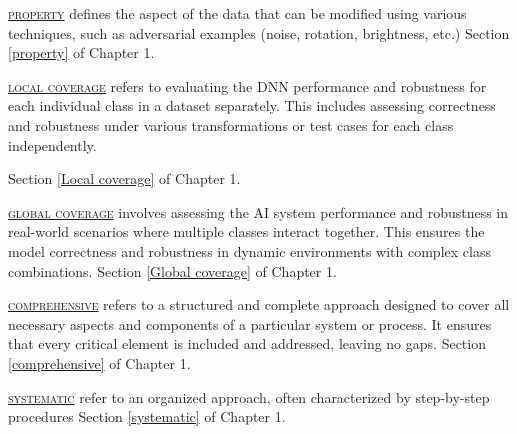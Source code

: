   \textsc{\hyperref[property]{\textsc{property}}} 
  defines the aspect of the data that can be modified using various techniques, such as adversarial examples (noise, rotation, brightness, etc.) Section \ref{property} of Chapter 1.
  
 


  \textsc{\hyperref[Local coverage]{\textsc{local coverage}}}
  refers to evaluating the DNN performance and robustness for each individual class in a dataset separately. This includes assessing  correctness and robustness under various transformations or test cases for each class independently.

  Section \ref{Local coverage} of Chapter 1.

  \textsc{\hyperref[Global coverage]{\textsc{global coverage}}}
  involves assessing the AI system performance and robustness in real-world scenarios where multiple classes interact together. This ensures the model correctness and robustness in dynamic environments with complex class combinations. Section \ref{Global coverage} of Chapter 1.


\textsc{\hyperref[comprehensive]{\textsc{comprehensive}}}  refers to a structured and complete approach designed to cover all necessary aspects and components of a particular system or process. It ensures that every critical element is included and addressed, leaving no gaps. Section \ref{comprehensive} of Chapter 1.
  
\textsc{\hyperref[systematic]{\textsc{systematic}}} refer to an organized approach, often characterized by step-by-step procedures Section \ref{systematic} of Chapter 1.





